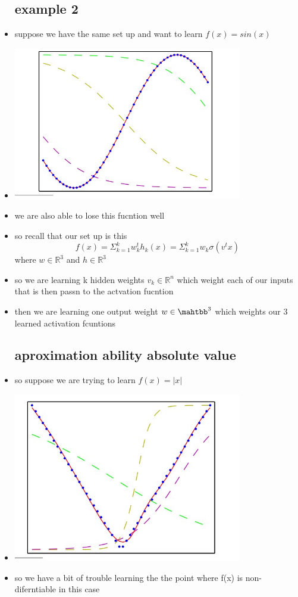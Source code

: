 \documentclass{article}
\begin{document}
\begin{itemize}
\subsection{example 2 }
\item suppose we have the same set up and want to learn $f(x)=sin(x)$
\item \includegraphics[width=10cm]{lecture_notes/lecture_11/immages/l11_8.jpg}
\item we are also able to lose this fucntion well 
\item so recall that our set up is this $$f(x)=\Sigma_{k=1}^{k}w_k^th_k(x)=\Sigma_{k=1}^{k}w_k\sigma(v^tx)$$ where $w\in \mathbb{R}^{3}$ and $h\in \mathbb{R}^3$
\item so we are learning k hidden weights $v_k\in \mathbb{R}^{n}$ which weight each of our inputs that is then passn to the actvation fucntion 
\item then we are learning one output weight $w\in \mahtbb^{3}$ which weights our 3 learned activation fcuntions 
\subsection{aproximation ability absolute value}
\item so suppose we are trying to learn $f(x)=|x|$
\item \includegraphics[width=10cm]{lecture_notes/lecture_11/immages/l11_9.jpg}
\item so we have a bit of trouble learning the the point where f(x) is non-diferntiable in this case 

\end{itemize}
\end{document}
